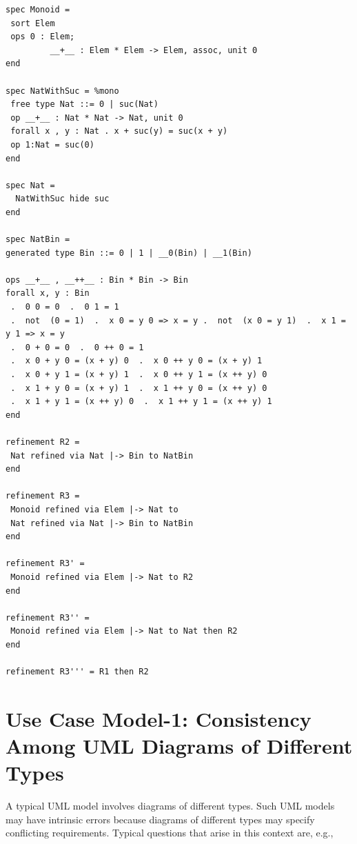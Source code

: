 \documentclass[10pt,fleqn,%
\ifpretendfinal
final%
\else
draft%
\fi,
]{scrreprt}
\begin{document}
\begin{lstlisting}[basicstyle=\ttfamily\footnotesize,language=dolText,morekeywords={sort, ops, refinement, free,spec type, assoc, unit,props,op,spec,refined, via,generated, then,ObjectProperty,Class,DisjointUnionOf,SubClassOf,Characteristics,Transitive,Asymmetric,SubPropertyOf,DisjointClasses,EquivalentTo,inverse,only,forall,iff,if,or,exists,distributed,from},escapechar=@,mathescape]	
spec Monoid =
 sort Elem
 ops 0 : Elem;
         __+__ : Elem * Elem -> Elem, assoc, unit 0
end

spec NatWithSuc = %mono
 free type Nat ::= 0 | suc(Nat)
 op __+__ : Nat * Nat -> Nat, unit 0 
 forall x , y : Nat . x + suc(y) = suc(x + y)
 op 1:Nat = suc(0)
end

spec Nat =
  NatWithSuc hide suc
end

spec NatBin =
generated type Bin ::= 0 | 1 | __0(Bin) | __1(Bin)

ops __+__ , __++__ : Bin * Bin -> Bin 
forall x, y : Bin 
 .  0 0 = 0  .  0 1 = 1
 .  not  (0 = 1)  .  x 0 = y 0 => x = y .  not  (x 0 = y 1)  .  x 1 = y 1 => x = y
 .  0 + 0 = 0  .  0 ++ 0 = 1 
 .  x 0 + y 0 = (x + y) 0  .  x 0 ++ y 0 = (x + y) 1
 .  x 0 + y 1 = (x + y) 1  .  x 0 ++ y 1 = (x ++ y) 0 
 .  x 1 + y 0 = (x + y) 1  .  x 1 ++ y 0 = (x ++ y) 0
 .  x 1 + y 1 = (x ++ y) 0  .  x 1 ++ y 1 = (x ++ y) 1 
end

refinement R2 =
 Nat refined via Nat |-> Bin to NatBin
end

refinement R3 =
 Monoid refined via Elem |-> Nat to
 Nat refined via Nat |-> Bin to NatBin
end

refinement R3' =
 Monoid refined via Elem |-> Nat to R2
end

refinement R3'' = 
 Monoid refined via Elem |-> Nat to Nat then R2
end

refinement R3''' = R1 then R2

\end{lstlisting}



\section{Use Case Model-1: Consistency Among UML Diagrams of Different Types}
\label{model-1}

A typical UML model involves diagrams of different types. Such UML models may have intrinsic errors because diagrams of different types may specify conflicting 
requirements. Typical questions that arise in this context are, e.g.,
\end{document}

